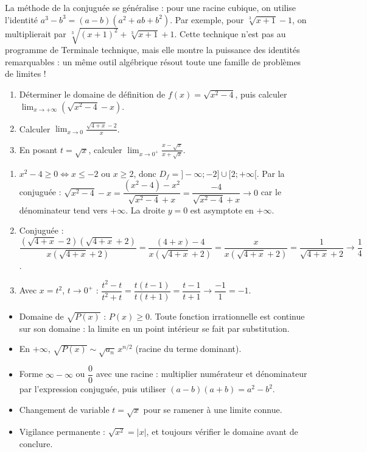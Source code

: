 \documentclass[11pt]{article}
\newcommand{\cle}[1]{{\popxbold\color{popdark}#1}}
\begin{document}
\begin{savaistu}
La méthode de la conjuguée se généralise : pour une racine cubique, on utilise l'identité $a^3-b^3=(a-b)(a^2+ab+b^2)$. Par exemple, pour $\sqrt[3]{x+1}-1$, on multiplierait par $\sqrt[3]{(x+1)^2}+\sqrt[3]{x+1}+1$. Cette technique n'est pas au programme de Terminale technique, mais elle montre la puissance des identités remarquables : un même outil algébrique résout toute une famille de problèmes de limites !
\end{savaistu}

\begin{exercice}[À faire]
\begin{enumerate}
\item Déterminer le domaine de définition de $f(x)=\sqrt{x^2-4}$, puis calculer $\lim_{x\to+\infty}\left(\sqrt{x^2-4}-x\right)$.
\item Calculer $\displaystyle\lim_{x\to 0}\frac{\sqrt{4+x}-2}{x}$.
\item En posant $t=\sqrt{x}$, calculer $\displaystyle\lim_{x\to 0^+}\frac{x-\sqrt{x}}{x+\sqrt{x}}$.
\end{enumerate}
\end{exercice}

\begin{corrige}[Exercice]
\begin{enumerate}
\item $x^2-4\geq 0\iff x\leq -2$ ou $x\geq 2$, donc $D_f=]-\infty;-2]\cup[2;+\infty[$. Par la conjuguée : $\sqrt{x^2-4}-x=\dfrac{(x^2-4)-x^2}{\sqrt{x^2-4}+x}=\dfrac{-4}{\sqrt{x^2-4}+x}\to 0$ car le dénominateur tend vers $+\infty$. La droite $y=0$ est asymptote en $+\infty$.
\item Conjuguée : $\dfrac{(\sqrt{4+x}-2)(\sqrt{4+x}+2)}{x(\sqrt{4+x}+2)}=\dfrac{(4+x)-4}{x(\sqrt{4+x}+2)}=\dfrac{x}{x(\sqrt{4+x}+2)}=\dfrac{1}{\sqrt{4+x}+2}\to\dfrac{1}{4}$.
\item Avec $x=t^2$, $t\to 0^+$ : $\dfrac{t^2-t}{t^2+t}=\dfrac{t(t-1)}{t(t+1)}=\dfrac{t-1}{t+1}\to\dfrac{-1}{1}=-1$.
\end{enumerate}
\end{corrige}

\begin{aretenir}
\begin{itemize}
\item Domaine de $\sqrt{P(x)}$ : $P(x)\geq 0$. Toute fonction irrationnelle est continue sur son domaine : la limite en un point intérieur se fait par substitution.
\item En $+\infty$, $\sqrt{P(x)}\sim\sqrt{a_n}\,x^{n/2}$ (racine du terme dominant).
\item Forme $\infty-\infty$ ou $\dfrac{0}{0}$ avec une racine : multiplier numérateur et dénominateur par l'\cle{expression conjuguée}, puis utiliser $(a-b)(a+b)=a^2-b^2$.
\item Changement de variable $t=\sqrt{x}$ pour se ramener à une limite connue.
\item Vigilance permanente : $\sqrt{x^2}=|x|$, et toujours vérifier le domaine avant de conclure.
\end{itemize}
\end{aretenir}
\end{document}
